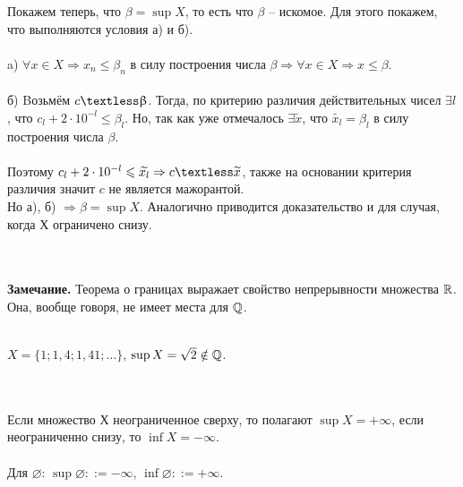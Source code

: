 \begin{Proof}
	Покажем теперь, что $\beta = \sup X$, то есть что $\beta$ -- искомое. Для этого покажем, что выполняются условия а) и б).\\\\
	a) $\forall x \in X \Rightarrow x_n \leq \beta_n$ в силу построения числа $\beta \Rightarrow \forall x \in X \Rightarrow x \leq \beta$.\\\\
	б) Bозьмём $c \textless \beta$. Тогда, по критерию различия действительных чисел $\exists l$, что $c_l + 2 \cdot 10^{-l} \leq \beta_l$. Но, так как уже отмечалось $\exists \widetilde{x}$, что $\widetilde{x_l} = \beta_l$ в силу построения числа $\beta$.\\\\
	Поэтому $c_l + 2 \cdot 10^{-l} \leq \widetilde{x_l} \Rightarrow c \textless \widetilde{x}$, также на основании критерия различия значит $c$ не является мажорантой.\\
	Но а), б) $\Rightarrow \beta = \sup X$.
	Аналогично приводится доказательство и для случая, когда Х ограничено снизу.
\end{Proof}\\\\
\textbf{Замечание.} Теорема о границах выражает свойство непрерывности множества $\mathbb{R}$. Она, вообще говоря, не имеет места для $\mathbb{Q}$.\\\\
\begin{example}
	$X= \{1; 1,4; 1,41; \dotsc\}$, $\sup X =\sqrt{2} \notin \mathbb{Q}$.
\end{example}\\\\
Если множество Х неограниченное сверху, то полагают $\sup X = +\infty$, если неограниченно снизу, то $\inf X = -\infty$.\\\\
Для $\varnothing$: $\sup\varnothing::= - \infty$, $\inf\varnothing::= +\infty$.

